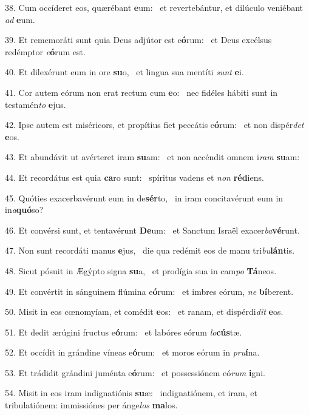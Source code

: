38. Cum occíderet eos, quærébant \textbf{e}um: \ast\  et revertebántur, et dilúculo veniébant \textit{ad} \textbf{e}um.\

39. Et rememoráti sunt quia Deus adjútor est e\textbf{ó}rum: \ast\  et Deus excélsus redémptor \textit{e}\textbf{ó}rum est.\

40. Et dilexérunt eum in ore \textbf{su}o, \ast\  et lingua sua mentíti \textit{sunt} \textbf{e}i.\

41. Cor autem eórum non erat rectum cum \textbf{e}o: \ast\  nec fidéles hábiti sunt in testamén\textit{to} \textbf{e}jus.\

42. Ipse autem est miséricors, et propítius fiet peccátis e\textbf{ó}rum: \ast\  et non dispér\textit{det} \textbf{e}os.\

43. Et abundávit ut avérteret iram \textbf{su}am: \ast\  et non accéndit omnem i\textit{ram} \textbf{su}am:\

44. Et recordátus est quia \textbf{ca}ro sunt: \ast\  spíritus vadens et \textit{non} \textbf{réd}iens.\

45. Quóties exacerbavérunt eum in de\textbf{sér}to, \ast\  in iram concitavérunt eum in in\textit{a}\textbf{quó}so?\

46. Et convérsi sunt, et tentavérunt \textbf{De}um: \ast\  et Sanctum Israël exacer\textit{ba}\textbf{vé}runt.\

47. Non sunt recordáti manus \textbf{e}jus, \ast\  die qua redémit eos de manu tri\textit{bu}\textbf{lán}tis.\

48. Sicut pósuit in Ægýpto signa \textbf{su}a, \ast\  et prodígia sua in cam\textit{po} \textbf{Tá}neos.\

49. Et convértit in sánguinem flúmina e\textbf{ó}rum: \ast\  et imbres eórum, \textit{ne} \textbf{bí}berent.\

50. Misit in eos cœnomyíam, et comédit \textbf{e}os: \ast\  et ranam, et dispérdi\textit{dit} \textbf{e}os.\

51. Et dedit ærúgini fructus e\textbf{ó}rum: \ast\  et labóres eórum \textit{lo}\textbf{cús}tæ.\

52. Et occídit in grándine víneas e\textbf{ó}rum: \ast\  et moros eórum in \textit{pru}\textbf{í}na.\

53. Et trádidit grándini juménta e\textbf{ó}rum: \ast\  et possessiónem eó\textit{rum} \textbf{i}gni.\

54. Misit in eos iram indignatiónis \textbf{su}æ: \ast\  indignatiónem, et iram, et tribulatiónem: immissiónes per ánge\textit{los} \textbf{ma}los.\

